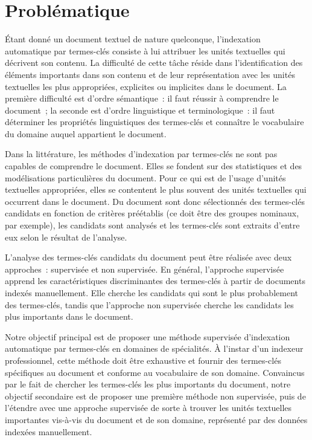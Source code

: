 
  \section{Problématique}
  \label{sec:main-introduction-problem_statement}
    Étant donné un document textuel de nature quelconque, l'indexation
    automatique par termes-clés consiste à lui attribuer les unités textuelles
    qui décrivent son contenu. La difficulté de cette tâche réside dans
    l'identification des éléments importants dans son contenu et de leur
    représentation avec les unités textuelles les plus appropriées, explicites
    ou implicites dans le document. La première difficulté est d'ordre
    sémantique~: il faut réussir à comprendre le document~; la seconde est
    d'ordre linguistique et terminologique~: il faut déterminer les propriétés
    linguistiques des termes-clés et connaître le vocabulaire du domaine auquel
    appartient le document.

    Dans la littérature, les méthodes d'indexation par termes-clés ne sont pas
    capables de comprendre le document. Elles se fondent sur des statistiques et
    des modélisations particulières du document. Pour ce qui est de l'usage
    d'unités textuelles appropriées, elles se contentent le plus souvent des
    unités textuelles qui occurrent dans le document. Du document sont donc
    sélectionnés des termes-clés candidats en fonction de critères préétablis
    (ce doit être des groupes nominaux, par exemple), les candidats sont
    analysés et les termes-clés sont extraits d'entre eux selon le résultat de
    l'analyse.

    L'analyse des termes-clés candidats du document peut être réalisée avec deux
    approches~: supervisée et non supervisée. En général, l'approche supervisée
    apprend les caractéristiques discriminantes des termes-clés à partir de
    documents indexés manuellement. Elle cherche les candidats qui sont le plus
    probablement des termes-clés, tandis que l'approche non supervisée cherche
    les candidats les plus importants dans le document.

    Notre objectif principal est de proposer une méthode supervisée d'indexation
    automatique par termes-clés en domaines de spécialités. À l'instar d'un
    indexeur professionnel, cette méthode doit être exhaustive et fournir des
    termes-clés spécifiques au document et conforme au vocabulaire de son
    domaine. Convaincus par le fait de chercher les termes-clés les plus
    importants du document, notre objectif secondaire est de proposer une
    première méthode non supervisée, puis de l'étendre avec une approche
    supervisée de sorte à trouver les unités textuelles importantes vis-à-vis du
    document et de son domaine, représenté par des données indexées
    manuellement.

